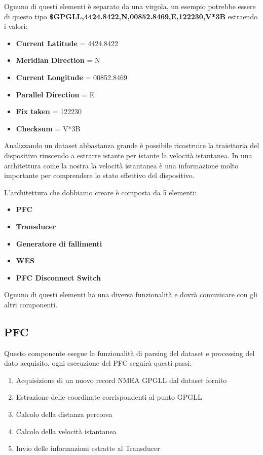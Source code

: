 \documentclass{article}
\begin{document}
\begin{flushleft}
Ognuno di questi elementi è separato da una virgola, un esempio potrebbe essere di questo tipo \textbf{\$GPGLL,4424.8422,N,00852.8469,E,122230,V*3B} estraendo i valori:

\begin{itemize}
    \item \textbf{Current Latitude} = 4424.8422
    \item \textbf{Meridian Direction} = N
    \item \textbf{Current Longitude} = 00852.8469
    \item \textbf{Parallel Direction} = E
    \item \textbf{Fix taken} = 122230
    \item \textbf{Checksum} = V*3B
\end{itemize}

Analizzando un dataset abbastanza grande è possibile ricostruire la traiettoria del dispositivo riuscendo a estrarre istante per istante la velocità istantanea. In una architettura come la nostra la velocità istantanea è una informazione molto importante per comprendere lo stato effettivo del dispositivo.

L'architettura che dobbiamo creare è composta da 5 elementi:

\begin{itemize}
    \item \textbf{PFC}
    \item \textbf{Transducer}
    \item \textbf{Generatore di fallimenti}
    \item \textbf{WES}
    \item \textbf{PFC Disconnect Switch}
\end{itemize}

Ognuno di questi elementi ha una diversa funzionalità e dovrà comunicare con gli altri componenti.

\subsection{PFC}

Questo componente esegue la funzionalità di parsing del dataset e processing del dato acquisito, ogni esecuzione del PFC seguirà questi passi:

\begin{enumerate}
    \item Acquisizione di un nuovo record NMEA GPGLL dal dataset fornito
    \item Estrazione delle coordinate corrispondenti al punto GPGLL
    \item Calcolo della distanza percorsa
    \item Calcolo della velocità istantanea
    \item Invio delle informazioni estratte al Transducer
\end{enumerate}


\end{flushleft}
\end{document}
